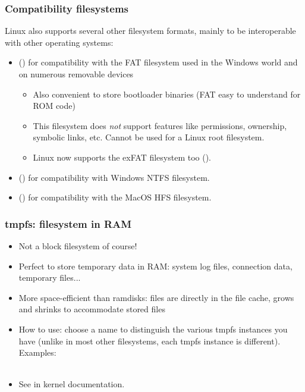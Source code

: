 \begin{frame}
  \frametitle{Compatibility filesystems}
  Linux also supports several other filesystem formats, mainly to be
  interoperable with other operating systems:
  \begin{itemize}
  \item {} () for compatibility with the FAT filesystem used in
    the Windows world and on numerous removable devices
    \begin{itemize}
    \item Also convenient to store bootloader binaries (FAT easy
      to understand for ROM code)
    \item This filesystem does {\em not} support features like
      permissions, ownership, symbolic links, etc. Cannot be used for
      a Linux root filesystem.
    \item Linux now supports the exFAT filesystem too ().
    \end{itemize}
  \item {} () for compatibility with
      Windows NTFS filesystem.
  \item {} () for compatibility with the
      MacOS HFS filesystem.
  \end{itemize}
\end{frame}

\begin{frame}
  \frametitle{tmpfs: filesystem in RAM}
  \begin{itemize}
  \item Not a block filesystem of course!
  \item Perfect to store temporary data in RAM: system log files,
    connection data, temporary files...
  \item More space-efficient than ramdisks: files are directly in the
    file cache, grows and shrinks to accommodate stored files
  \item How to use: choose a name to distinguish the various tmpfs
    instances you have (unlike in most other filesystems, each
    tmpfs instance is different). Examples:\\
    \\
  \item See  in kernel documentation.
  \end{itemize}
\end{frame}

